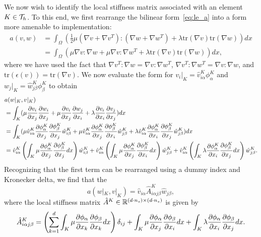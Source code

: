 We now wish to identify the local stiffness matrix associated with an element $K \in \mathcal{T}_h$.  To this end, we first rearrange the bilinear form~\eqref{eq:le_a} into a form more amenable to implementation:
\begin{align*}
  a(v,w)
  &=
  \int_\Omega (\frac{1}{2} \mu (\nabla v + \nabla v^T) : (\nabla w + \nabla w^T) + \lambda \text{tr}(\nabla v) \text{tr}(\nabla w)) dx
  \\
  &=
  \int_\Omega ( \mu \nabla v :\nabla w + \mu \nabla v : \nabla w^T + \lambda \text{tr}(\nabla v) \text{tr}(\nabla w)) dx,
\end{align*}
where we have used the fact that $\nabla v^T : \nabla w = \nabla v : \nabla w^T$, $\nabla v^T: \nabla w^T = \nabla v : \nabla w$, and $\text{tr}(\epsilon(v)) = \text{tr}(\nabla v)$. We now evaluate the form for $v_i|_K = \hat v^K_{i\alpha} \phi^K_\alpha$ and $w_j|_K = \hat w^K_{j\beta} \phi^K_\beta$ to obtain
\begin{align*}
  &a(w|_K ,v|_K) \\
  &=
  \int_K ( \mu \frac{\partial v_i}{\partial x_j} \frac{\partial w_i}{\partial x_j}
  + \mu \frac{\partial v_i}{\partial x_j} \frac{\partial w_j}{\partial x_i}
  + \lambda \frac{\partial v_i}{\partial x_i} \frac{\partial v_j}{\partial x_j} ) dx 
  \\
  &=
  \int_K (
  \mu \hat v^K_{i\alpha} \frac{\partial \phi^K_\alpha}{\partial x_j} \frac{\partial \phi^K_\beta}{\partial x_j} \hat w^K_{i\beta}
  + \mu \hat v^K_{i\alpha} \frac{\partial \phi^K_\alpha}{\partial x_j} \frac{\partial \phi^K_\beta}{\partial x_i} \hat w^K_{j\beta}
  + \lambda \hat v^K_{i\alpha} \frac{\partial \phi^K_\alpha}{\partial x_i} \frac{\partial \phi^K_\beta}{\partial x_j} \hat w^K_{j\beta} ) dx
  \\
  &=
  \hat v^K_{i\alpha} \left( \int_K \mu \frac{\partial \phi^K_\alpha}{\partial x_j} \frac{\partial \phi^K_\beta}{\partial x_j} dx \right) \hat w^K_{i\beta}
  + \hat v^K_{i\alpha} \left( \int_K \mu \frac{\partial \phi^K_\alpha}{\partial x_j} \frac{\partial \phi^K_\beta}{\partial x_i} dx \right) \hat w^K_{j\beta}
  +\hat v^K_{i\alpha} \left( \int_K \lambda \frac{\partial \phi^K_\alpha}{\partial x_i} \frac{\partial \phi^K_\beta}{\partial x_j} dx  \right) \hat w^K_{j\beta}.
\end{align*}
Recognizing that the first term can be rearranged using a dummy index and Kronecker delta, we find that the
\begin{equation*}
  a(w|_K,v|_K) = \hat v_{i\alpha} \hat A^K_{i\alpha j\beta} \hat w_{j\beta},
\end{equation*}
where the local stiffness matrix $\hat A^K \in \mathbb{R}^{(d \cdot n_s) \times (d \cdot n_s)}$ is given by
\begin{equation*}
  \hat A^K_{i\alpha j\beta} = \left( \sum_{k=1}^d \int_K \mu \frac{\partial \phi_\alpha}{\partial x_k} \frac{\partial \phi_\beta}{\partial x_k} dx \right) \delta_{ij} +  \int_K \mu \frac{\partial \phi_\alpha}{\partial x_j} \frac{\partial \phi_\beta}{\partial x_i} dx + \int_K \lambda \frac{\partial \phi_\alpha}{\partial x_i} \frac{\partial \phi_\beta}{\partial x_j} dx.
\end{equation*}
